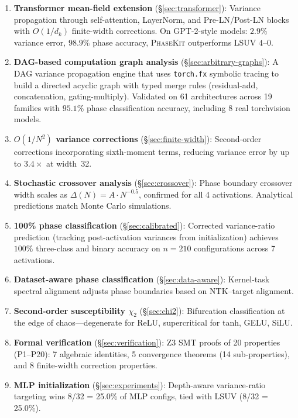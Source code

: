 \documentclass[10pt]{article}
\newcommand{\ToolName}{\textsc{PhaseKit}}
\begin{document}
\begin{enumerate}[nosep]
    \item \textbf{Transformer mean-field extension} (\S\ref{sec:transformer}): Variance propagation through self-attention, LayerNorm, and Pre-LN/Post-LN blocks with $O(1/d_k)$ finite-width corrections. On GPT-2-style models: $2.9\%$ variance error, $98.9\%$ phase accuracy, \ToolName{} outperforms LSUV $4$--$0$.
    \item \textbf{DAG-based computation graph analysis} (\S\ref{sec:arbitrary-graphs}): A DAG variance propagation engine that uses \texttt{torch.fx} symbolic tracing to build a directed acyclic graph with typed merge rules (residual-add, concatenation, gating-multiply). Validated on 61 architectures across 19 families with $95.1\%$ phase classification accuracy, including 8 real torchvision models.
    \item \textbf{$O(1/N^2)$ variance corrections} (\S\ref{sec:finite-width}): Second-order corrections incorporating sixth-moment terms, reducing variance error by up to $3.4\times$ at width~32.
    \item \textbf{Stochastic crossover analysis} (\S\ref{sec:crossover}): Phase boundary crossover width scales as $\Delta(N) = A \cdot N^{-0.5}$, confirmed for all 4 activations. Analytical predictions match Monte Carlo simulations.
    \item \textbf{100\% phase classification} (\S\ref{sec:calibrated}): Corrected variance-ratio prediction (tracking post-activation variances from initialization) achieves $100\%$ three-class and binary accuracy on $n=210$ configurations across 7 activations.
    \item \textbf{Dataset-aware phase classification} (\S\ref{sec:data-aware}): Kernel-task spectral alignment adjusts phase boundaries based on NTK--target alignment.
    \item \textbf{Second-order susceptibility $\chi_2$} (\S\ref{sec:chi2}): Bifurcation classification at the edge of chaos---degenerate for ReLU, supercritical for tanh, GELU, SiLU.
    \item \textbf{Formal verification} (\S\ref{sec:verification}): Z3 SMT proofs of 20 properties (P1--P20): 7 algebraic identities, 5 convergence theorems (14 sub-properties), and 8 finite-width correction properties.
    \item \textbf{MLP initialization} (\S\ref{sec:experiments}): Depth-aware variance-ratio targeting wins 8/32 = 25.0\% of MLP configs, tied with LSUV (8/32 = 25.0\%).
\end{enumerate}
\end{document}
